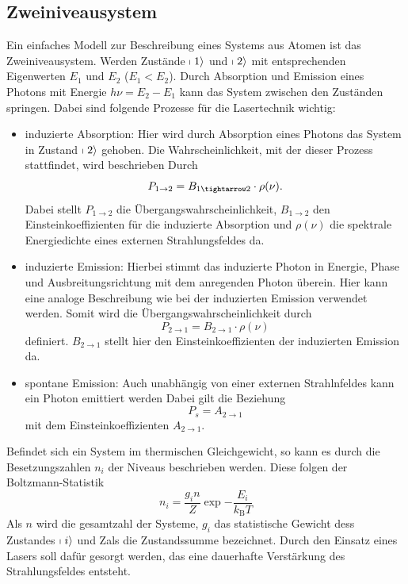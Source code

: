 \subsection{Zweiniveausystem}
Ein einfaches Modell zur Beschreibung eines Systems aus Atomen ist das Zweiniveausystem.
Werden Zustände $\shortmid 1 \rangle$ und $\shortmid 2 \rangle$ mit entsprechenden
Eigenwerten $E_1$ und $E_2$ ($E_1<E_2$). Durch Absorption und Emission eines Photons mit
Energie $h\nu=E_2-E_1$ kann das System zwischen den Zuständen springen. Dabei sind
folgende Prozesse für die Lasertechnik wichtig:
\begin{itemize}
  \item induzierte Absorption:
  Hier wird durch Absorption eines Photons das System in Zustand $\shortmid 2 \rangle$
  gehoben. Die Wahrscheinlichkeit, mit der dieser Prozess stattfindet, wird beschrieben
  Durch
  \begin{equation}
    P_{1\rightarrow 2} = B_{1\tightarrow 2}\cdot \rho(\nu).
  \end{equation}
  Dabei stellt $P_{1\rightarrow 2}$ die Übergangswahrscheinlichkeit, $B_{1\rightarrow 2}$ den
  Einsteinkoeffizienten für die induzierte Absorption und $\rho(\nu)$ die spektrale Energiedichte
  eines externen Strahlungsfeldes da.
  \item induzierte Emission:
  Hierbei stimmt das induzierte Photon in Energie, Phase und Ausbreitungsrichtung
  mit dem anregenden Photon überein. Hier kann eine analoge Beschreibung wie bei der
  induzierten Emission verwendet werden. Somit wird die Übergangswahrscheinlichkeit durch
  \begin{equation}
    P_{2\rightarrow 1} = B_{2\rightarrow 1}\cdot\rho(\nu)
  \end{equation}
  definiert. $B_{2\rightarrow 1}$ stellt hier den Einsteinkoeffizienten der induzierten
  Emission da.
  \item spontane Emission:
  Auch unabhängig von einer externen Strahlnfeldes kann ein Photon emittiert werden
  Dabei gilt die Beziehung
  \begin{equation}
    P_s = A_{2\rightarrow 1}
  \end{equation}
  mit dem Einsteinkoeffizienten $A_{2\rightarrow 1}$.
\end{itemize}

Befindet sich ein System im thermischen Gleichgewicht, so kann es durch die
Besetzungszahlen $n_i$ der Niveaus beschrieben werden. Diese folgen der Boltzmann-Statistik
\begin{equation}
    n_i = \frac{g_in}{Z}\exp{-\frac{E_i}{k_\text{B}T}}
\end{equation}
Als $n$ wird die gesamtzahl der Systeme, $g_i$ das statistische Gewicht dess Zustandes
$\shortmid i \rangle$ und Zals die Zustandssumme bezeichnet. Durch den Einsatz
eines Lasers soll dafür gesorgt werden, das eine dauerhafte Verstärkung des
Strahlungsfeldes entsteht.

